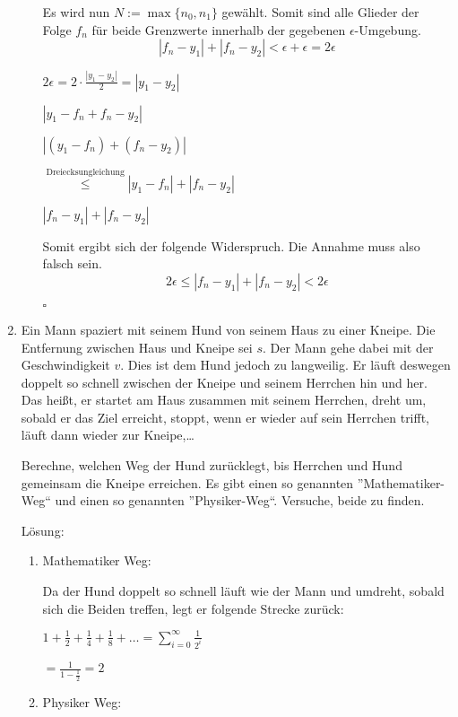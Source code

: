 \documentclass[main.tex]{subfiles}
\begin{document}
\begin{enumerate}
\begin{enumerate}
		            Es wird nun \( N := \max\{n_0, n_1\} \) gewählt. Somit sind alle Glieder der Folge \( f_n \)  für beide Grenzwerte innerhalb
		            der gegebenen \( \epsilon  \)-Umgebung.
		            \[ |f_n - y_1| + |f_n - y_2| < \epsilon + \epsilon = 2\epsilon \]

		            \( 2\epsilon =  2 \cdot \frac{|y_1 - y_2|}{2} = |y_1 - y_2|\)

		            \( |y_1 - f_n + f_n - y_2| \)

		            \( |(y_1 - f_n) + (f_n - y_2)| \)

		            \( \stackrel{\text{Dreiecksungleichung}}{\leq} |y_1 -f_n| + |f_n - y_2| \)

		            \( |f_n - y_1| + |f_n - y_2| \)

		            Somit ergibt sich der folgende Widerspruch. Die Annahme muss also falsch sein.
					\[ 2 \epsilon \leq  |f_n - y_1| + |f_n - y_2| < 2 \epsilon \]
					
					\( \square \)
	      \end{enumerate}
	\item Ein Mann spaziert mit seinem Hund von seinem Haus zu einer Kneipe. Die
	      Entfernung zwischen Haus und Kneipe sei \( s \). Der Mann gehe dabei mit der
	      Geschwindigkeit \( v \). Dies ist dem Hund jedoch zu langweilig. Er läuft deswegen
	      doppelt so schnell zwischen der Kneipe und seinem Herrchen hin und her.
	      Das heißt, er startet am Haus zusammen mit seinem Herrchen, dreht um,
	      sobald er das Ziel erreicht, stoppt, wenn er wieder auf sein Herrchen trifft,
	      läuft dann wieder zur Kneipe,\dots

	      Berechne, welchen Weg der Hund zurücklegt, bis Herrchen und Hund gemeinsam die Kneipe erreichen.
	      Es gibt einen so genannten ”Mathematiker-Weg“ und einen so genannten
	      ”Physiker-Weg“. Versuche, beide zu finden.

	      Lösung:
	      \begin{enumerate}
		      \item Mathematiker Weg:

		            Da der Hund doppelt so schnell läuft wie der Mann und umdreht, sobald sich die Beiden treffen, legt er
		            folgende Strecke zurück:

		            \( 1 + \frac{1}{2} + \frac{1}{4} + \frac{1}{8} + \dots = \sum_{i = 0}^{\infty} \frac{1}{2^i}\)

		            \( = \frac{1}{1 - \frac{1}{2}} = 2  \)
		      \item Physiker Weg:


\end{enumerate}
\end{enumerate}
\end{document}
